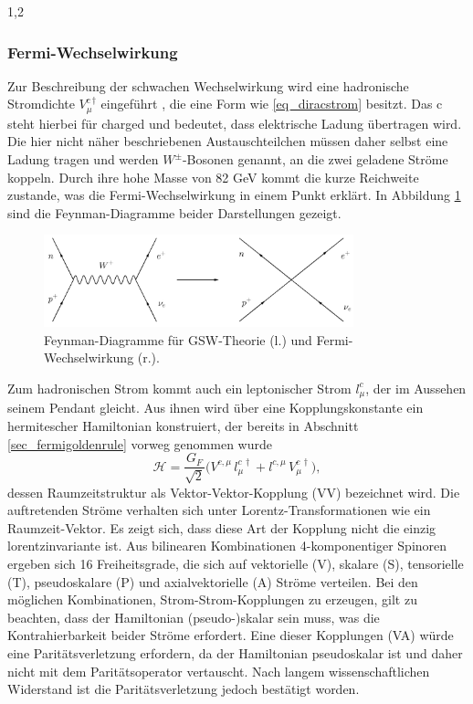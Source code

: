 \documentclass[11pt,a4paper,twoside]{report}
\begin{document}
\begin{spacing}{1,2}
\subsubsection{Fermi-Wechselwirkung}
\label{sec_fermiWW}
Zur Beschreibung der schwachen Wechselwirkung wird eine hadronische Stromdichte $V_\mu^{\text{c}\,\dagger}$ eingeführt \cite{Klapdor}, die eine Form wie 
\eqref{eq_diracstrom} besitzt. 
Das $\text{c}$ steht hierbei für charged und bedeutet, dass elektrische Ladung
übertragen wird. Die hier nicht näher beschriebenen Austauschteilchen müssen daher selbst eine Ladung tragen und werden $W^\pm$-Bosonen genannt, an die zwei 
geladene Ströme koppeln. Durch ihre hohe Masse von 82 GeV kommt die kurze Reichweite zustande, was die Fermi-Wechselwirkung in einem Punkt erklärt. In
Abbildung \ref{pic_4fermi} sind die Feynman-Diagramme beider Darstellungen gezeigt.
\begin{figure}[H]
\includegraphics[width=0.8\textwidth]{Abbildungen/4fermi.jpg}
\caption{Feynman-Diagramme für GSW-Theorie (l.) und Fermi-Wechselwirkung (r.).}
\label{pic_4fermi}
\end{figure}
\noindent
Zum hadronischen Strom kommt auch ein leptonischer Strom $l_\mu^c$, der im Aussehen seinem Pendant gleicht. Aus ihnen wird über eine Kopplungskonstante
ein hermitescher Hamiltonian konstruiert, der bereits in Abschnitt \ref{sec_fermigoldenrule} vorweg genommen wurde
\begin{equation}
 \mathcal{H} = \frac{G_F}{\sqrt{2}}\big(V^{c,\mu}\,l_\mu^{c\,\dagger} + l^{c,\mu}\,V_\mu^{c\,\dagger}\big),
\end{equation}
dessen Raumzeitstruktur als Vektor-Vektor-Kopplung (VV) bezeichnet wird. Die auftretenden Ströme verhalten sich unter Lorentz-Transformationen wie ein Raumzeit-Vektor.
Es zeigt sich, dass diese Art der Kopplung nicht die einzig lorentzinvariante ist. Aus bilinearen Kombinationen 4-komponentiger Spinoren ergeben sich 16 Freiheitsgrade,
die sich auf vektorielle (V), skalare (S), tensorielle (T), pseudoskalare (P) und axialvektorielle (A) Ströme verteilen. Bei den möglichen Kombinationen, Strom-Strom-Kopplungen zu erzeugen, gilt zu beachten, dass
der Hamiltonian (pseudo-)skalar sein muss, was die Kontrahierbarkeit beider Ströme erfordert. Eine dieser Kopplungen (VA) würde eine Paritätsverletzung erfordern,
da der Hamiltonian pseudoskalar ist und daher nicht mit dem Paritätsoperator vertauscht. Nach langem wissenschaftlichen Widerstand ist die Paritätsverletzung
jedoch bestätigt worden.


\end{spacing}
\end{document}
